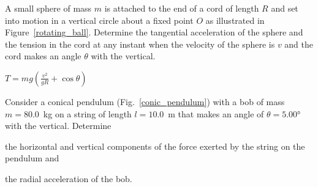 

\begin{problem}\label{prb:rotating_ball}
	A small sphere of mass $m$ is attached to the end of a cord of length $R$ and set into motion in a vertical circle about a fixed point $O$ as illustrated in Figure~\ref{rotating_ball}. Determine the tangential acceleration of the sphere and the tension in the cord at any instant when the velocity of the sphere is $v$ and the cord makes an angle $\theta$ with the vertical.
	\begin{solution}
		$T = mg \left( \frac{v^2}{gR} + \cos\theta\right) $
	\end{solution}
\end{problem}

\begin{problem}\label{prb:conic_pendulum}
	Consider a conical pendulum (Fig.~\ref{conic_pendulum}) with a bob of mass $m = 80.0$~kg on a string of length $l = 10.0$~m that makes an angle of $\theta = \ang{5.00}$ with the vertical. Determine 
	\begin{enumerate*}[label=(\alph*)]
		\item the horizontal and vertical components of the force exerted by the string on the pendulum and
		\item the radial acceleration of the bob.
	\end{enumerate*}
\end{problem}

